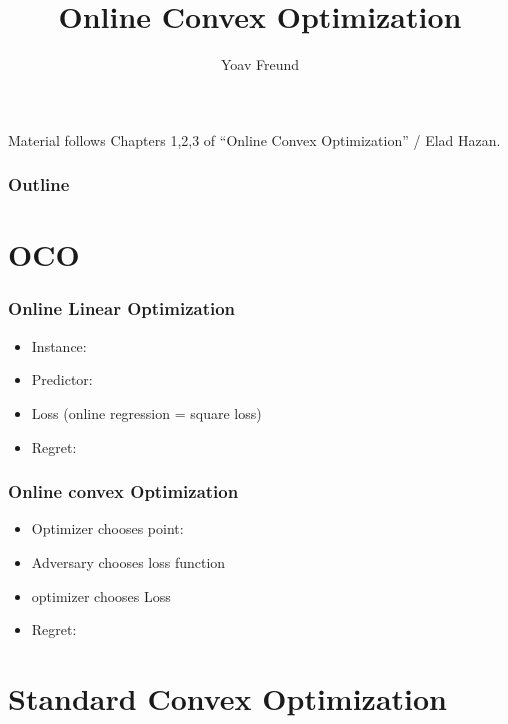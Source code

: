 \documentclass[handout]{beamer}
\title[\ouralg] %
{Online Convex Optimization}
\author[Freund] %
{Yoav Freund}
\institute[Universities of Somewhere and Elsewhere] %
\begin{document}

\begin{frame}
  \titlepage
  \begin{small}
    Material follows Chapters 1,2,3 of ``Online Convex Optimization''
    / Elad Hazan.
  \end{small}
\end{frame}

\begin{frame}
  \frametitle{Outline}
  \tableofcontents[pausesections]
\end{frame}

\section{OCO}
\begin{frame}
  \frametitle{Online Linear Optimization}
  \begin{itemize}
  \item Instance: 
  \item Predictor: 
  \item Loss  (online regression = square loss)
  \item Regret: 
  \end{itemize}
\end{frame}

\begin{frame}
  \frametitle{Online convex Optimization}
  \begin{itemize}
  \item Optimizer chooses point:
  \item Adversary chooses  loss function 
  \item optimizer chooses Loss 
  \item Regret: 
  \end{itemize}
\end{frame}

\section{Standard Convex Optimization}
\end{document}
